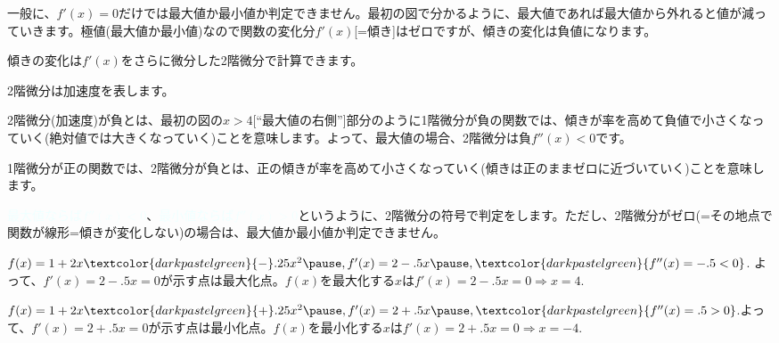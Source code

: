 \begin{frame}[t]{}
\begin{dinglist}{45}
\vspace{1.0ex}\setlength{\itemsep}{1.0ex}\setlength{\baselineskip}{12pt}
\item	一般に、$f'(x)=0$だけでは最大値か最小値か判定できません。最初の図で分かるように、最大値であれば最大値から外れると値が減っていきます。極値(最大値か最小値)なので関数の変化分$f'(x)$[=傾き]はゼロですが、傾きの変化は負値になります。
\pause
\item	傾きの変化は$f'(x)$をさらに微分した2階微分で計算できます。
	\begin{dinglist}{43}
	\vspace{1.0ex}\setlength{\itemsep}{1.0ex}\setlength{\baselineskip}{12pt}
\pause
	\item	2階微分は加速度を表します。
\pause
	\item	2階微分(加速度)が負とは、最初の図の$x>4$[``最大値の右側'']部分のように1階微分が負の関数では、傾きが率を高めて負値で小さくなっていく(絶対値では大きくなっていく)ことを意味します。よって、最大値の場合、2階微分は負$f''(x)<0$です。
\pause
	\item	1階微分が正の関数では、2階微分が負とは、正の傾きが率を高めて小さくなっていく(傾きは正のままゼロに近づいていく)ことを意味します。
	\end{dinglist}
\pause
\item	\textcolor{azure}{最大値ならば$f''(x)<0$}、\textcolor{azure}{最小値ならば$f''(x)>0$}というように、2階微分の符号で判定をします。ただし、2階微分がゼロ(=その地点で関数が線形=傾きが変化しない)の場合は、最大値か最小値か判定できません。
\end{dinglist}
\end{frame}

\begin{frame}[t]{}
\begin{dinglist}{43}
\vspace{1.0ex}\setlength{\itemsep}{1.0ex}\setlength{\baselineskip}{12pt}
\pause
\item	$f(x)=1+2x\textcolor{darkpastelgreen}{-}.25x^{2}\pause , f'(x)=2-.5x\pause , \textcolor{darkpastelgreen}{f''(x)=-.5<0}$. \pause よって、$f'(x)=2-.5x=0$が示す点は最\textcolor{darkpastelgreen}{大}化点。\pause $f(x)$を最大化する$x$は$f'(x)=2-.5x=0 \Rightarrow x=4.$
\pause
\item	$f(x)=1+2x\textcolor{darkpastelgreen}{+}.25x^{2}\pause , f'(x)=2+.5x\pause , \textcolor{darkpastelgreen}{f''(x)=.5>0}$.\pause  よって、$f'(x)=2+.5x=0$が示す点は最\textcolor{darkpastelgreen}{小}化点。\pause $f(x)$を最小化する$x$は$f'(x)=2+.5x=0 \Rightarrow x=-4.$
\end{dinglist}
\end{frame}

